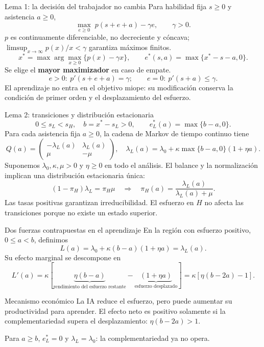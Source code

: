 \documentclass[aspectratio=169,11pt]{beamer}
\newcommand{\lam}{\lambda_L}
\begin{document}
\begin{frame}{Lema 1: la decisión del trabajador no cambia}
  Para habilidad fija $s\geq0$ y asistencia $a\geq0$,
  \[
    \max_{e\geq0}\;p(s+e+a)-\gamma e,\qquad \gamma>0.
  \]
  $p$ es continuamente diferenciable, no decreciente y cóncava;
  $\limsup_{x\to\infty}p(x)/x<\gamma$ garantiza máximos finitos.
  \[
    x^*=\max\arg\max_{x\geq0}\{p(x)-\gamma x\},\qquad
    e^*(s,a)=\max\{x^*-s-a,0\}.
  \]
  Se elige el \textbf{mayor maximizador} en caso de empate.
  \[
    e>0:\ p'(s+e+a)=\gamma;\qquad
    e=0:\ p'(s+a)\leq\gamma.
  \]
  El aprendizaje no entra en el objetivo miope: su modificación conserva
  la condición de primer orden y el desplazamiento del esfuerzo.
\end{frame}

\begin{frame}{Lema 2: transiciones y distribución estacionaria}
  \[
    0\leq s_L<s_H,\quad b=x^*-s_L>0,\qquad
    \boxed{e_L^*(a)=\max\{b-a,0\}.}
  \]
  Para cada asistencia fija $a\geq0$, la cadena de Markov de tiempo continuo tiene
  \[
    Q(a)=\begin{pmatrix}-\lam(a)&\lam(a)\\ \mu&-\mu\end{pmatrix},\quad
    \lam(a)=\lambda_0+\kappa\max\{b-a,0\}(1+\eta a).
  \]
  Suponemos $\lambda_0,\kappa,\mu>0$ y $\eta\geq0$ en todo el análisis.
  El balance y la normalización implican una distribución estacionaria única:
  \[
    (1-\pi_H)\lam=\pi_H\mu
    \quad\Longrightarrow\quad
    \boxed{\pi_H(a)=\frac{\lam(a)}{\lam(a)+\mu}.}
  \]
  Las tasas positivas garantizan irreducibilidad. El esfuerzo en $H$ no
  afecta las transiciones porque no existe un estado superior.
\end{frame}

\begin{frame}{Dos fuerzas contrapuestas en el aprendizaje}
  En la región con esfuerzo positivo, $0\leq a<b$, definimos
  \[
    L(a)=\lambda_0+\kappa(b-a)(1+\eta a)=\lam(a).
  \]
  Su efecto marginal se descompone en
  \[
    L'(a)=\kappa\left[
      \underbrace{\eta(b-a)}_{\text{rendimiento del esfuerzo restante}}
      -\underbrace{(1+\eta a)}_{\text{esfuerzo desplazado}}
    \right]
    =\kappa[\eta(b-2a)-1].
  \]
  \begin{block}{Mecanismo económico}
  La IA reduce el esfuerzo, pero puede aumentar su productividad para aprender.
  El efecto neto es positivo solamente si la complementariedad supera
  el desplazamiento: $\eta(b-2a)>1$.
  \end{block}
  Para $a\geq b$, $e_L^*=0$ y $\lam=\lambda_0$: la complementariedad ya no opera.
\end{frame}
\end{document}
